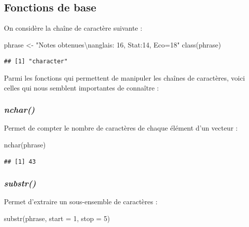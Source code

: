 \documentclass[
]{book}
\newenvironment{Shaded}{\begin{snugshade}}{\end{snugshade}}
\newcommand{\AttributeTok}[1]{\textcolor[rgb]{0.77,0.63,0.00}{#1}}
\newcommand{\DecValTok}[1]{\textcolor[rgb]{0.00,0.00,0.81}{#1}}
\newcommand{\FunctionTok}[1]{\textcolor[rgb]{0.00,0.00,0.00}{#1}}
\newcommand{\NormalTok}[1]{#1}
\newcommand{\OtherTok}[1]{\textcolor[rgb]{0.56,0.35,0.01}{#1}}
\newcommand{\SpecialCharTok}[1]{\textcolor[rgb]{0.00,0.00,0.00}{#1}}
\newcommand{\StringTok}[1]{\textcolor[rgb]{0.31,0.60,0.02}{#1}}
\theoremstyle{definition}
\theoremstyle{definition}
\theoremstyle{definition}
\theoremstyle{definition}
\theoremstyle{remark}
\begin{document}
\hypertarget{fonctions-de-base}{%
\subsection{Fonctions de base}\label{fonctions-de-base}}

On considère la chaîne de caractère suivante :

\begin{Shaded}
\begin{Highlighting}[]
\NormalTok{phrase }\OtherTok{\textless{}{-}} \StringTok{"Notes obtenues}\SpecialCharTok{\textbackslash{}n}\StringTok{anglais: 16, Stat:14, Eco=18"}
\FunctionTok{class}\NormalTok{(phrase)}
\end{Highlighting}
\end{Shaded}

\begin{verbatim}
## [1] "character"
\end{verbatim}

Parmi les fonctions qui permettent de manipuler les chaînes de caractères, voici celles qui nous semblent importantes de connaître :

\hypertarget{nchar}{%
\subsubsection{\texorpdfstring{\emph{nchar()}}{nchar()}}\label{nchar}}

Permet de compter le nombre de caractères de chaque élément d'un vecteur :

\begin{Shaded}
\begin{Highlighting}[]
\FunctionTok{nchar}\NormalTok{(phrase)}
\end{Highlighting}
\end{Shaded}

\begin{verbatim}
## [1] 43
\end{verbatim}

\hypertarget{substr}{%
\subsubsection{\texorpdfstring{\emph{substr()}}{substr()}}\label{substr}}

Permet d'extraire un sous-ensemble de caractères :

\begin{Shaded}
\begin{Highlighting}[]
\FunctionTok{substr}\NormalTok{(phrase, }\AttributeTok{start =} \DecValTok{1}\NormalTok{, }\AttributeTok{stop =} \DecValTok{5}\NormalTok{)}
\end{Highlighting}
\end{Shaded}
\end{document}
